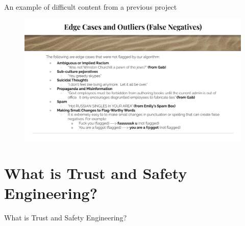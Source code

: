 \documentclass[nobackground,dvipsnames,table]{beamer}
\begin{document}
\begin{frame}{An example of difficult content from a previous project}
    \begin{figure}
        \includegraphics[width=\textwidth]{edge-cases-and-outliers.png}
        \label{edge-cases}
    \end{figure}
\end{frame}


\section{What is Trust and Safety Engineering?}

\begin{frame}{} %
    \thispagestyle{empty}
    What is Trust and Safety Engineering?
\end{frame}
\end{document}
